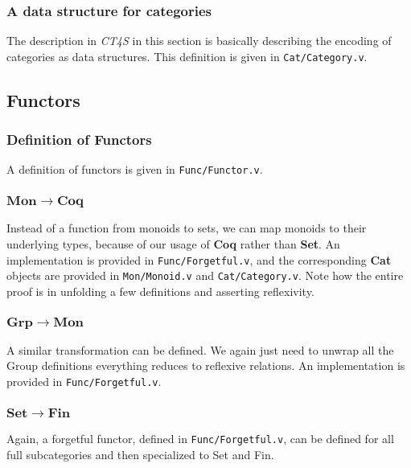 \documentclass[12pt,twocolumn,oneside]{book}
\begin{document}
\subsubsection{A data structure for categories}

The description in \emph{CT4S} in this section is basically describing the encoding
of categories as data structures. This definition is given in \texttt{Cat/Category.v}.

\subsection{Functors}

\subsubsection{Definition of Functors}

A definition of functors is given in \texttt{Func/Functor.v}.

\subsubsection{$\mathbf{Mon} \to \mathbf{Coq}$}

Instead of a function from monoids to sets, we can map monoids to their underlying types, because
of our usage of \textbf{Coq} rather than \textbf{Set}. An implementation is provided
in \texttt{Func/Forgetful.v}, and the corresponding \textbf{Cat} objects are provided in \texttt{Mon/Monoid.v}
and \texttt{Cat/Category.v}. Note how the entire proof is in unfolding a few definitions and
asserting reflexivity.

\subsubsection{$\mathbf{Grp} \to \mathbf{Mon}$}

A similar transformation can be defined. We again just need to unwrap all the Group
definitions everything reduces to reflexive relations. An implementation is provided
in \texttt{Func/Forgetful.v}.


\subsubsection{$\mathbf{Set} \to \mathbf{Fin}$}

Again, a forgetful functor, defined in \texttt{Func/Forgetful.v}, can be defined for all full
subcategories and then specialized to Set and Fin.
\end{document}
